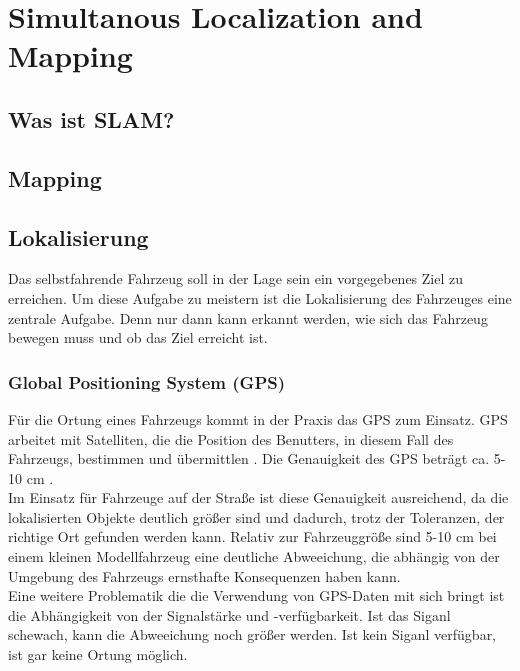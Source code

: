 \section{Simultanous Localization and Mapping}

\subsection{Was ist SLAM?}

\subsection{Mapping}

\subsection{Lokalisierung}
Das selbstfahrende Fahrzeug soll in der Lage sein ein vorgegebenes Ziel zu erreichen. 
Um diese Aufgabe zu meistern ist die Lokalisierung des Fahrzeuges eine zentrale Aufgabe. Denn nur dann kann erkannt werden, wie sich das Fahrzeug bewegen muss
und ob das Ziel erreicht ist.
\subsubsection{Global Positioning System (GPS)}
Für die Ortung eines Fahrzeugs kommt in der Praxis das GPS zum Einsatz. GPS arbeitet mit Satelliten, die die Position des Benutters, in diesem Fall des Fahrzeugs, bestimmen
und übermittlen \cite{ashby2003relativity}. Die Genauigkeit des GPS beträgt ca. 5-10 cm \cite{ashby2003relativity}. \\
Im Einsatz für Fahrzeuge auf der Straße ist diese Genauigkeit ausreichend, da die lokalisierten Objekte deutlich größer sind und dadurch, trotz der Toleranzen, der richtige Ort gefunden werden kann.
Relativ zur Fahrzeuggröße sind 5-10 cm bei einem kleinen Modellfahrzeug eine deutliche Abweeichung, die abhängig von der Umgebung des Fahrzeugs ernsthafte Konsequenzen haben kann. \\
Eine weitere Problematik die die Verwendung von GPS-Daten mit sich bringt ist die Abhängigkeit von der Signalstärke und -verfügbarkeit. Ist das Siganl schewach, kann die Abweeichung noch größer werden. Ist kein Siganl
verfügbar, ist gar keine Ortung möglich.
